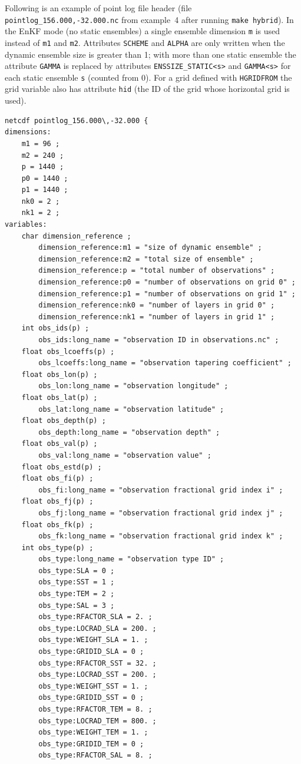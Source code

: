 \documentclass[11pt]{report}
\begin{document}
Following is an example of point log file header (file \verb|pointlog_156.000,-32.000.nc| from example~4 after running \verb|make hybrid|).
In the EnKF mode (no static ensembles) a single ensemble dimension \verb|m| is used instead of \verb|m1| and \verb|m2|.
Attributes \verb|SCHEME| and \verb|ALPHA| are only written when the dynamic ensemble size is greater than 1; with more than one static ensemble the attribute \verb|GAMMA| is replaced by attributes \verb|ENSSIZE_STATIC<s>| and \verb|GAMMA<s>| for each static ensemble \verb|s| (counted from 0).
For a grid defined with \verb|HGRIDFROM| the grid variable also has attribute \verb|hid| (the ID of the grid whose horizontal grid is used).
\begin{Verbatim}[frame=single,fontsize=\footnotesize]
netcdf pointlog_156.000\,-32.000 {
dimensions:
	m1 = 96 ;
	m2 = 240 ;
	p = 1440 ;
	p0 = 1440 ;
	p1 = 1440 ;
	nk0 = 2 ;
	nk1 = 2 ;
variables:
	char dimension_reference ;
		dimension_reference:m1 = "size of dynamic ensemble" ;
		dimension_reference:m2 = "total size of ensemble" ;
		dimension_reference:p = "total number of observations" ;
		dimension_reference:p0 = "number of observations on grid 0" ;
		dimension_reference:p1 = "number of observations on grid 1" ;
		dimension_reference:nk0 = "number of layers in grid 0" ;
		dimension_reference:nk1 = "number of layers in grid 1" ;
	int obs_ids(p) ;
		obs_ids:long_name = "observation ID in observations.nc" ;
	float obs_lcoeffs(p) ;
		obs_lcoeffs:long_name = "observation tapering coefficient" ;
	float obs_lon(p) ;
		obs_lon:long_name = "observation longitude" ;
	float obs_lat(p) ;
		obs_lat:long_name = "observation latitude" ;
	float obs_depth(p) ;
		obs_depth:long_name = "observation depth" ;
	float obs_val(p) ;
		obs_val:long_name = "observation value" ;
	float obs_estd(p) ;
	float obs_fi(p) ;
		obs_fi:long_name = "observation fractional grid index i" ;
	float obs_fj(p) ;
		obs_fj:long_name = "observation fractional grid index j" ;
	float obs_fk(p) ;
		obs_fk:long_name = "observation fractional grid index k" ;
	int obs_type(p) ;
		obs_type:long_name = "observation type ID" ;
		obs_type:SLA = 0 ;
		obs_type:SST = 1 ;
		obs_type:TEM = 2 ;
		obs_type:SAL = 3 ;
		obs_type:RFACTOR_SLA = 2. ;
		obs_type:LOCRAD_SLA = 200. ;
		obs_type:WEIGHT_SLA = 1. ;
		obs_type:GRIDID_SLA = 0 ;
		obs_type:RFACTOR_SST = 32. ;
		obs_type:LOCRAD_SST = 200. ;
		obs_type:WEIGHT_SST = 1. ;
		obs_type:GRIDID_SST = 0 ;
		obs_type:RFACTOR_TEM = 8. ;
		obs_type:LOCRAD_TEM = 800. ;
		obs_type:WEIGHT_TEM = 1. ;
		obs_type:GRIDID_TEM = 0 ;
		obs_type:RFACTOR_SAL = 8. ;

\end{Verbatim}
\end{document}
